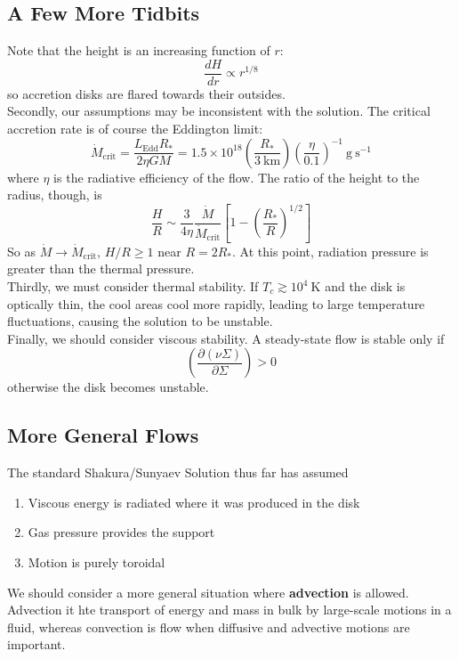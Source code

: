 \documentclass[10pt]{article}
\numberwithin{equation}{section}
\newcommand{\n}{\noindent}
\begin{document}
\subsection{A Few More Tidbits} %
\label{sub:a_few_more_tidbits}
Note that the height is an increasing function of $r$:
\begin{equation}
	\label{eq:tidbits:1} \frac{dH}{dr}\propto r^{1/8}
\end{equation}
so accretion disks are flared towards their outsides.\\

\n Secondly, our assumptions may be inconsistent with the solution. The critical accretion rate is of course the Eddington limit:
\begin{equation}
	\label{eq:tidbits:2} \dot{M}_{\mathrm{crit}} = \frac{L_{\mathrm{Edd}}R_*}{2\eta GM} = 1.5\times 10^{18}\left(\frac{R_*}{3\ \mathrm{km}}\right)\left(\frac{\eta}{0.1}\right)^{-1}\ \mathrm{g\ s^{-1}}
\end{equation}
where $\eta$ is the radiative efficiency of the flow. The ratio of the height to the radius, though, is
\begin{equation}
	\label{eq:tidbits:3} \frac{H}{R} \sim \frac{3}{4\eta}\frac{\dot{M}}{\dot{M}_{\mathrm{crit}}} \left[1- \left(\frac{R_*}{R}\right)^{1/2}\right]
\end{equation}
So as $\dot{M}\to \dot{M}_{\mathrm{crit}}$, $H/R\geq 1$ near $R=2R_*$. At this point, radiation pressure is greater than the thermal pressure.\\

\n Thirdly, we must consider thermal stability. If $T_c \gtrsim 10^4\ \mathrm{K}$ and the disk is optically thin, the cool areas cool more rapidly, leading to large temperature fluctuations, causing the solution to be unstable.\\

\n Finally, we should consider viscous stability. A steady-state flow is stable only if 
\begin{equation}
	\label{eq:tidbits:4} \left(\frac{\partial (\nu\Sigma)}{\partial \Sigma}\right) > 0
\end{equation}
otherwise the disk becomes unstable.
\subsection{More General Flows} %
\label{sub:more_general_flows}
The standard Shakura/Sunyaev Solution thus far has assumed
\begin{enumerate}
	\item Viscous energy is radiated where it was produced in the disk
	\item Gas pressure provides the support
	\item Motion is purely toroidal
\end{enumerate}
We should consider a more general situation where \textbf{advection} is allowed. Advection it hte transport of energy  and mass in bulk by large-scale motions in a fluid, whereas convection is flow when diffusive and advective motions are important.\\
\end{document}
